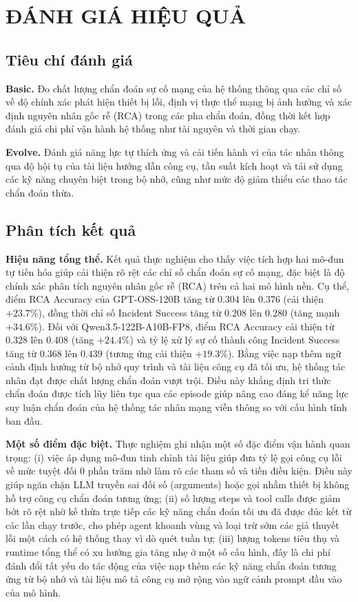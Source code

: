 \section{ĐÁNH GIÁ HIỆU QUẢ}

\subsection{Tiêu chí đánh giá}

\noindent\textbf{Basic.} Đo chất lượng chẩn đoán sự cố mạng của hệ thống thông qua các chỉ số về độ chính xác phát hiện thiết bị lỗi, định vị thực thể mạng bị ảnh hưởng và xác định nguyên nhân gốc rễ (RCA) trong các pha chẩn đoán, đồng thời kết hợp đánh giá chi phí vận hành hệ thống như tài nguyên và thời gian chạy.

\noindent\textbf{Evolve.} Đánh giá năng lực tự thích ứng và cải tiến hành vi của tác nhân thông qua độ hội tụ của tài liệu hướng dẫn công cụ, tần suất kích hoạt và tái sử dụng các kỹ năng chuyên biệt trong bộ nhớ, cũng như mức độ giảm thiểu các thao tác chẩn đoán thừa.

\subsection{Phân tích kết quả}

\noindent\textbf{Hiệu năng tổng thể.} Kết quả thực nghiệm cho thấy việc tích hợp hai mô-đun tự tiến hóa giúp cải thiện rõ rệt các chỉ số chẩn đoán sự cố mạng, đặc biệt là độ chính xác phân tích nguyên nhân gốc rễ (RCA) trên cả hai mô hình nền. Cụ thể, điểm RCA Accuracy của GPT-OSS-120B tăng từ $0.304$ lên $0.376$ (cải thiện $+23.7\%$), đồng thời chỉ số Incident Success tăng từ $0.208$ lên $0.280$ (tăng mạnh $+34.6\%$). Đối với Qwen3.5-122B-A10B-FP8, điểm RCA Accuracy cải thiện từ $0.328$ lên $0.408$ (tăng $+24.4\%$) và tỷ lệ xử lý sự cố thành công Incident Success tăng từ $0.368$ lên $0.439$ (tương ứng cải thiện $+19.3\%$). Bằng việc nạp thêm ngữ cảnh định hướng từ bộ nhớ quy trình và tài liệu công cụ đã tối ưu, hệ thống tác nhân đạt được chất lượng chẩn đoán vượt trội. Điều này khẳng định tri thức chẩn đoán được tích lũy liên tục qua các episode giúp nâng cao đáng kể năng lực suy luận chẩn đoán của hệ thống tác nhân mạng viễn thông so với cấu hình tĩnh ban đầu.

\noindent\textbf{Một số điểm đặc biệt.} Thực nghiệm ghi nhận một số đặc điểm vận hành quan trọng: (i) việc áp dụng mô-đun tinh chỉnh tài liệu giúp đưa tỷ lệ gọi công cụ lỗi về mức tuyệt đối 0 phần trăm nhờ làm rõ các tham số và tiền điều kiện. Điều này giúp ngăn chặn LLM truyền sai đối số (arguments) hoặc gọi nhầm thiết bị không hỗ trợ công cụ chẩn đoán tương ứng; (ii) số lượng steps và tool calls được giảm bớt rõ rệt nhờ kế thừa trực tiếp các kỹ năng chẩn đoán tối ưu đã được đúc kết từ các lần chạy trước, cho phép agent khoanh vùng và loại trừ sớm các giả thuyết lỗi một cách có hệ thống thay vì dò quét tuần tự; (iii) lượng tokens tiêu thụ và runtime tổng thể có xu hướng gia tăng nhẹ ở một số cấu hình, đây là chi phí đánh đổi tất yếu do tác động của việc nạp thêm các kỹ năng chẩn đoán tương ứng từ bộ nhớ và tài liệu mô tả công cụ mở rộng vào ngữ cảnh prompt đầu vào của mô hình.

